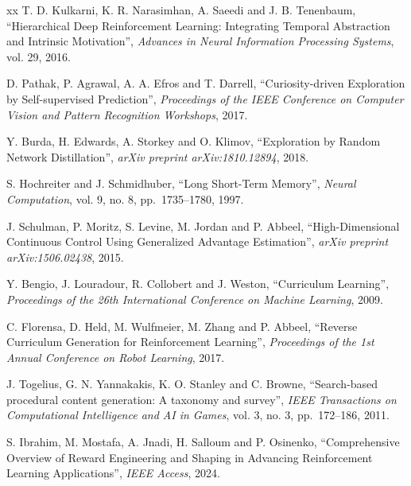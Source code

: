 \documentclass[a4paper,12pt,oneside]{book}
\begin{document}
\begin{thebibliography}{xx}
	T. D. Kulkarni, K. R. Narasimhan, A. Saeedi and J. B. Tenenbaum, ``Hierarchical Deep Reinforcement Learning: Integrating Temporal Abstraction and Intrinsic Motivation'',
	{\em Advances in Neural Information Processing Systems}, vol. 29, 2016.

	D. Pathak, P. Agrawal, A. A. Efros and T. Darrell, ``Curiosity-driven Exploration by Self-supervised Prediction'',
	{\em Proceedings of the IEEE Conference on Computer Vision and Pattern Recognition Workshops}, 2017.

	Y. Burda, H. Edwards, A. Storkey and O. Klimov, ``Exploration by Random Network Distillation'',
	{\em arXiv preprint arXiv:1810.12894}, 2018.

	S. Hochreiter and J. Schmidhuber, ``Long Short-Term Memory'',
	{\em Neural Computation}, vol. 9, no. 8, pp.~1735--1780, 1997.

	J. Schulman, P. Moritz, S. Levine, M. Jordan and P. Abbeel,
	``High-Dimensional Continuous Control Using Generalized Advantage Estimation'',
	{\em arXiv preprint arXiv:1506.02438}, 2015.

	Y. Bengio, J. Louradour, R. Collobert and J. Weston, ``Curriculum Learning'',
	{\em Proceedings of the 26th International Conference on Machine Learning}, 2009.

	C. Florensa, D. Held, M. Wulfmeier, M. Zhang and P. Abbeel,
	``Reverse Curriculum Generation for Reinforcement Learning'',
	{\em Proceedings of the 1st Annual Conference on Robot Learning}, 2017.

	J. Togelius, G. N. Yannakakis, K. O. Stanley and C. Browne,
	``Search-based procedural content generation: A taxonomy and survey'',
	{\em IEEE Transactions on Computational Intelligence and AI in Games}, vol. 3, no. 3, pp.~172--186, 2011.

	S. Ibrahim, M. Mostafa, A. Jnadi, H. Salloum and P. Osinenko, ``Comprehensive Overview of Reward Engineering and Shaping in Advancing Reinforcement Learning Applications'',
	{\em IEEE Access}, 2024.


\end{thebibliography}
\end{document}
